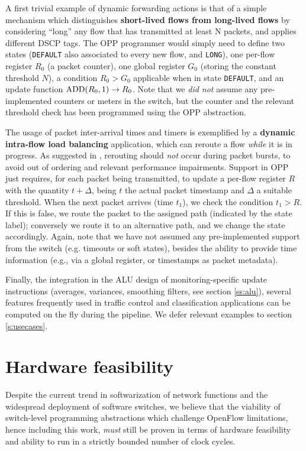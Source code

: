 \documentclass{sig-alternate}
\begin{document}
A first trivial example of dynamic forwarding actions is that of a simple mechanism which distinguishes {\bf short-lived flows from long-lived flows} by considering ``long'' any flow that has transmitted at least N packets, and applies different DSCP tags. The OPP programmer would simply need to define two states (\texttt{DEFAULT} also associated to every new flow, and \texttt{LONG}), one per-flow register $R_0$ (a packet counter), one global register $G_0$ (storing the constant threshold $N$), a condition $R_0>G_0$ applicable when in state \texttt{DEFAULT}, and an update function ${\rm ADD}(R_0,1) \rightarrow R_0$. Note that we {\em did not} assume any pre-implemented counters or meters in the switch, but the counter and the relevant threshold check has been programmed using the OPP abstraction.

The usage of packet inter-arrival times and timers is exemplified by a {\bf dynamic intra-flow load balancing} application, which can reroute a flow {\em while} it is in progress. As suggested in \cite{Kan07}, rerouting should {\em not} occur during packet bursts, to avoid out of ordering and relevant performance impairments. Support in OPP just requires, for each packet being transmitted, to update a per-flow register $R$ with the quantity $t+\Delta$, being $t$ the actual packet timestamp and $\Delta$ a suitable threshold. When the next packet arrives (time $t_1$), we check the condition $t_1>R$. If this is false, we route the packet to the assigned path (indicated by the state label); conversely we route it to an alternative path, and we change the state accordingly. Again, note that we have not assumed any pre-implemented support from the switch (e.g. timeouts or soft states), besides the ability to provide time information (e.g., via a global register, or timestamps as packet metadata).

Finally, the integration in the ALU design of monitoring-specific update instructions (averages, variances, smoothing filters, see section \ref{ss:alu}), several features frequently used in traffic control and classification applications can be computed on the fly during the pipeline. We defer relevant examples to section \ref{s:usecases}.



\section{Hardware feasibility}
\label{s:hardware}

Despite the current trend in softwarization of network functions and the widespread deployment of software switches, we believe that the viability of switch-level programming abstractions which challenge OpenFlow limitations, hence including this work, {\em must} still be proven in terms of hardware feasibility and ability to run in a strictly bounded number of clock cycles. 
\end{document}

